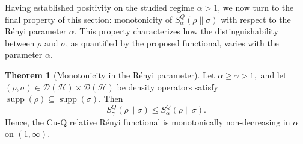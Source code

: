 \documentclass[a4paper, amsfonts, amssymb, amsmath, reprint, showkeys, nofootinbib, twoside, aps, pra]{revtex4-2}
\theoremstyle{definition}
\newtheorem{theorem}{Theorem}
\begin{document}
Having established positivity on the studied regime $\alpha>1$, we now turn to the final property of this section: monotonicity of $S_\alpha^Q(\rho\|\sigma)$ with respect to the Rényi parameter $\alpha$. This property characterizes how the distinguishability between $\rho$ and $\sigma$, as quantified by the proposed functional, varies with the parameter $\alpha$.
 
\begin{theorem}[Monotonicity in the Rényi parameter]\label{Th10}
Let $ \alpha \ge \gamma > 1,$ and let $(\rho,\sigma)\in \mathcal D(\mathcal H)\times\mathcal D(\mathcal H)$ be density operators satisfy $\operatorname{supp}(\rho)\subseteq\operatorname{supp}(\sigma).$
Then
\begin{equation}
S_\gamma^Q(\rho\|\sigma)
\le
S_\alpha^Q(\rho\|\sigma).
\end{equation}
Hence, the Cu-Q relative Rényi functional is monotonically
non-decreasing in $\alpha$ on $(1,\infty)$.
\end{theorem}
\end{document}
